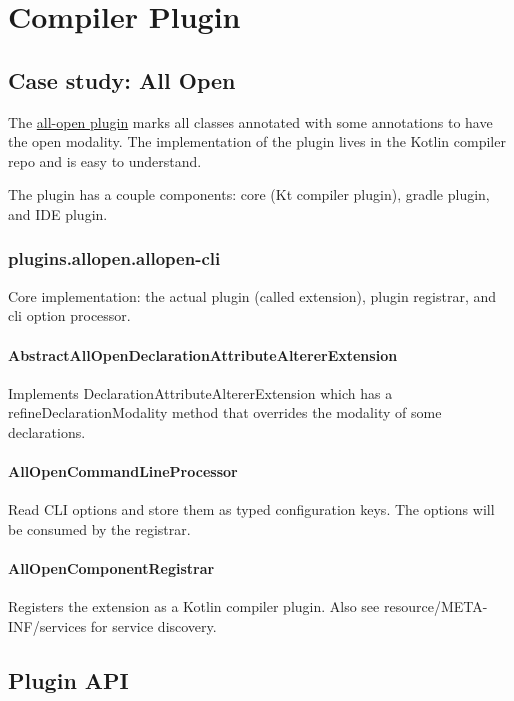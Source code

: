 \documentclass{article}
\begin{document}
\section{Compiler Plugin}

\subsection{Case study: All Open}

The \href{https://kotlinlang.org/docs/reference/compiler-plugins.html}{all-open plugin} marks all classes annotated with some annotations to have the open modality. The implementation of the plugin lives in the Kotlin compiler repo and is easy to understand.

The plugin has a couple components: core (Kt compiler plugin), gradle plugin, and IDE plugin.

\subsubsection{plugins.allopen.allopen-cli}

Core implementation: the actual plugin (called extension), plugin registrar, and cli option processor.

\paragraph{AbstractAllOpenDeclarationAttributeAltererExtension} Implements DeclarationAttributeAltererExtension which has a refineDeclarationModality method that overrides the modality of some declarations.

\paragraph{AllOpenCommandLineProcessor} Read CLI options and store them as typed configuration keys. The options will be consumed by the registrar.

\paragraph{AllOpenComponentRegistrar} Registers the extension as a Kotlin compiler plugin. Also see resource/META-INF/services for service discovery.

\subsection{Plugin API}
\end{document}
